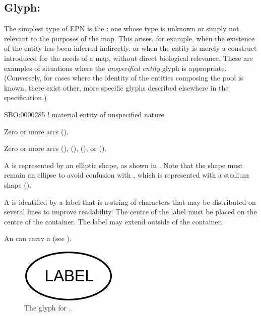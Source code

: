 
\subsection{Glyph: }
\label{sec:unspecifiedEntity}

The simplest type of EPN is the : one whose type is unknown or simply not relevant to the purposes of the map.
This arises, for example, when the existence of the entity has been inferred indirectly, or when the entity is merely a construct introduced for the needs of a map, without direct biological relevance.
These are examples of situations where the \emph{unspecified entity} glyph is appropriate.
(Conversely, for cases where the identity of the entities composing the pool is known, there exist other, more specific glyphs described elsewhere in the specification.)

\begin{glyphDescription}

\glyphSboTerm
 SBO:0000285 ! material entity of unspecified nature


\glyphIncoming
Zero or more  arcs ().



\glyphOutgoing
Zero or more  arcs (),  (),  (), or  ().


\glyphContainer
A  is represented by an elliptic shape, as shown in .
Note that the shape must remain an ellipse to avoid confusion with , which is represented with a stadium shape ().

\glyphLabel
A  is identified by a label  that is a string of characters that may be distributed on several lines to improve readability.
The centre of the label must be placed on the centre of the container.
The label may extend outside of the container.



\glyphAux
An  can carry a  (see ).

\end{glyphDescription}

\begin{figure}[H]
  \centering
  \includegraphics{images/unspecified}
  \caption{The \PD glyph for .}
  \label{fig:unspecified}
\end{figure}

